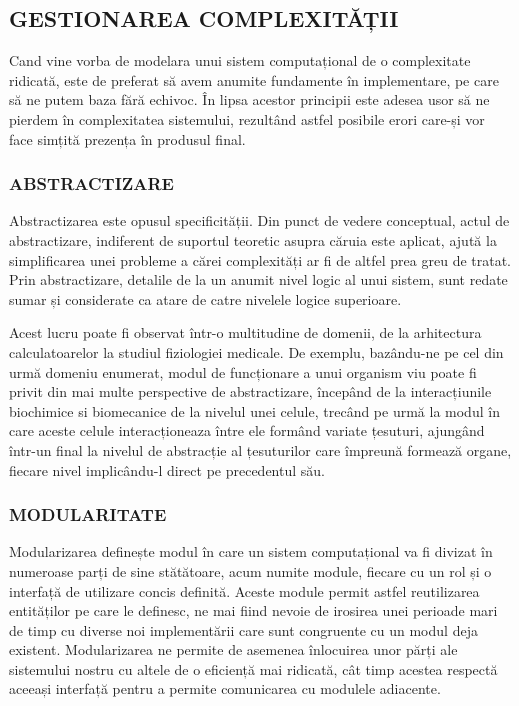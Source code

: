 \documentclass[12pt]{article}
\begin{document}
\subsection{GESTIONAREA COMPLEXITĂȚII}
Cand vine vorba de modelara unui sistem computațional de o complexitate ridicată, este de preferat să avem anumite fundamente în implementare, pe care să ne putem baza fără echivoc. În lipsa acestor principii este adesea usor să ne pierdem în complexitatea sistemului, rezultând astfel posibile erori care-și vor face simțită prezența în produsul final.

\subsubsection{ABSTRACTIZARE}
Abstractizarea este opusul specificității. Din punct de vedere conceptual, actul de abstractizare, indiferent de suportul teoretic asupra căruia este aplicat, ajută la simplificarea unei probleme a cărei complexități ar fi de altfel prea greu de tratat. Prin abstractizare, detalile de la un anumit nivel logic al unui sistem, sunt redate sumar și considerate ca atare de catre nivelele logice superioare.


Acest lucru poate fi observat într-o multitudine de domenii, de la arhitectura calculatoarelor la studiul fiziologiei medicale. De exemplu, bazându-ne pe cel din urmă domeniu enumerat, modul de funcționare a unui organism viu poate fi privit din mai multe perspective de abstractizare, începând de la interacțiunile biochimice si biomecanice de la nivelul unei celule, trecând pe urmă la modul în care aceste celule interacționeaza între ele formând variate țesuturi, ajungând într-un final la nivelul de abstracție al țesuturilor care împreună formează organe, fiecare nivel implicându-l direct pe precedentul său.

\subsubsection{MODULARITATE}
Modularizarea definește modul în care un sistem computațional va fi divizat în numeroase parți de sine stătătoare, acum numite module, fiecare cu un rol și o interfață de utilizare concis definită. Aceste module permit astfel reutilizarea  entităților pe care le definesc, ne mai fiind nevoie de irosirea unei perioade mari de timp cu diverse noi implementării care sunt congruente cu un modul deja existent. Modularizarea ne permite de asemenea înlocuirea unor părți ale sistemului nostru cu altele de o eficiență mai ridicată, cât timp acestea respectă aceeași interfață pentru a permite comunicarea cu modulele adiacente.
\end{document}
